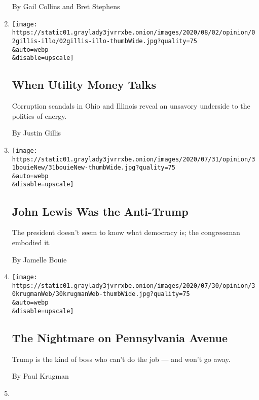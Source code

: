 \begin{enumerate}
  By Gail Collins and Bret Stephens
\item
  \href{/2020/08/02/opinion/utility-corruption-energy.html}{}

  \texttt{[image: https://static01.graylady3jvrrxbe.onion/images/2020/08/02/opinion/02gillis-illo/02gillis-illo-thumbWide.jpg?quality=75\\\&auto=webp\\\&disable=upscale]}

  \hypertarget{when-utility-money-talks}{%
  \subsection{When Utility Money Talks}\label{when-utility-money-talks}}

  Corruption scandals in Ohio and Illinois reveal an unsavory underside
  to the politics of energy.

  By Justin Gillis
\item
  \href{/2020/07/31/opinion/sunday/john-lewis-trump-election-2020.html}{}

  \texttt{[image: https://static01.graylady3jvrrxbe.onion/images/2020/07/31/opinion/31bouieNew/31bouieNew-thumbWide.jpg?quality=75\\\&auto=webp\\\&disable=upscale]}

  \hypertarget{john-lewis-was-the-anti-trump}{%
  \subsection{John Lewis Was the
  Anti-Trump}\label{john-lewis-was-the-anti-trump}}

  The president doesn't seem to know what democracy is; the congressman
  embodied it.

  By Jamelle Bouie
\item
  \href{/2020/07/30/opinion/trump-coronavirus-economy.html}{}

  \texttt{[image: https://static01.graylady3jvrrxbe.onion/images/2020/07/30/opinion/30krugmanWeb/30krugmanWeb-thumbWide.jpg?quality=75\\\&auto=webp\\\&disable=upscale]}

  \hypertarget{the-nightmare-on-pennsylvania-avenue}{%
  \subsection{The Nightmare on Pennsylvania
  Avenue}\label{the-nightmare-on-pennsylvania-avenue}}

  Trump is the kind of boss who can't do the job --- and won't go away.

  By Paul Krugman
\item
  \href{/2020/07/30/opinion/trump-delay-election-coronavirus.html}{}


\end{enumerate}
